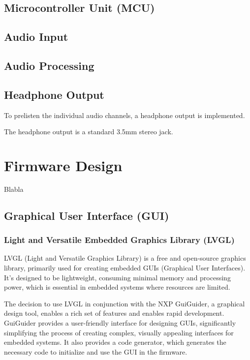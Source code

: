 \subsection{Microcontroller Unit (MCU)}



\subsection{Audio Input}

\subsection{Audio Processing}

\subsection{Headphone Output}

To prelisten the individual audio channels, a headphone output is implemented.

The headphone output is a standard 3.5mm stereo jack.



\newpage
\section{Firmware Design}
Blabla

\subsection{Graphical User Interface (GUI)}

\subsubsection{Light and Versatile Embedded Graphics Library (LVGL)}
LVGL (Light and Versatile Graphics Library) is a free and open-source graphics library, primarily used for creating embedded GUIs (Graphical User Interfaces).
It's designed to be lightweight, consuming minimal memory and processing power, which is essential in embedded systems where resources are limited.

The decision to use LVGL in conjunction with the NXP GuiGuider, a graphical design tool, enables a rich set of features and enables rapid development.
GuiGuider provides a user-friendly interface for designing GUIs, significantly simplifying the process of creating complex, visually appealing interfaces for embedded systems.
It also provides a code generator, which generates the necessary code to initialize and use the GUI in the firmware.

